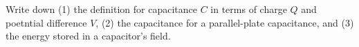 

\vspace*{\fill}
\centering

Write down (1) the definition for capacitance $C$ in terms of charge $Q$ and poetntial difference $V$, (2) the capacitance for a parallel-plate capacitance, and (3) the energy stored in a capacitor's field.

\centering
\vspace*{\fill}


